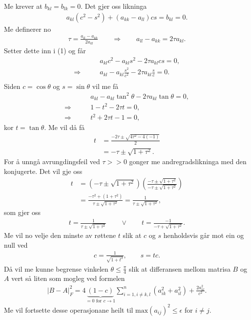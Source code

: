 \documentclass[11pt, a4paper]{article}
\begin{document}
    Me krever at $b_{kl} = b_{lk} = 0$. Det gjer oss likninga
    \begin{align}
      a_{kl}(c^2 - s^2) + (a_{kk} - a_{ll})cs = b_{kl} = 0.
    \end{align}
    Me definerer no 
    \begin{align*}
      \tau = \frac{a_{ll} - a_{kk}}{2a_{kl}} \qquad \Rightarrow \qquad a_{ll} - a_{kk} = 2\tau a_{kl}.
    \end{align*}
    Setter dette inn i (1) og får
    \begin{align*}
      &a_{kl}c^2 - a_{kl}s^2 - 2\tau a_{kl}cs = 0, \\
      \Rightarrow \qquad &a_{kl} - a_{kl}\frac{s^2}{c^2} - 2\tau a_{kl}\frac{s}{c} = 0. \\
    \end{align*}
    Siden $c = \cos{\theta}$ og $s = \sin{\theta}$ vil me få 
    \begin{align*}
      &a_{kl} - a_{kl}\tan^2{\theta} - 2\tau a_{kl} \tan{\theta} = 0, \\
      \Rightarrow \qquad &1 - t^2 - 2\tau t = 0, \\
      \Rightarrow \qquad &t^2 + 2\tau t - 1 = 0,
    \end{align*}
    kor $t = \tan{\theta}$. Me vil då få 
    \begin{align*}
      t &= \frac{-2\tau \pm \sqrt{4\tau^2 - 4(-1)}}{2} \\
      &= -\tau \pm \sqrt{1 + \tau^2}.
    \end{align*}
    For å unngå avrungdingsfeil ved $\tau >> 0$ gonger me andregradslikninga med den konjugerte. Det vil gje oss
    \begin{align*}
      t &= \left( -\tau \pm \sqrt{1 + \tau^2} \right)\left( \frac{-\tau \pm \sqrt{1 + \tau^2}}{-\tau \pm \sqrt{1 + \tau^2}} \right) \\
      &= \frac{-\tau^2 + (1 + \tau^2)}{\tau \pm \sqrt{1 + \tau^2}} = \frac{1}{\tau \pm \sqrt{1 + \tau^2}},
    \end{align*}
    som gjer oss
    \begin{align*}
      t = \frac{1}{\tau \pm \sqrt{1 + \tau^2}} \qquad \lor \qquad t = \frac{-1}{-\tau + \sqrt{1 + \tau^2}}.
    \end{align*}
    Me vil no velje den minste av røttene $t$ slik at $c$ og $s$ henholdsvis går mot ein og null ved
    \begin{align*}
      c = \frac{1}{\sqrt{1 + t^2}}, \qquad s = tc.
    \end{align*}
    Då vil me kunne begrense vinkelen $\theta \leq \frac{\pi}{4}$ slik at differansen mellom matrisa $B$ og $A$ vert så liten som mogleg ved formelen
    \begin{align*}
      \lvert B - A \rvert_F^2 = 4\underbrace{(1 - c)}_{= 0 \text{ for } c \to 1}\sum_{i = 1, i\ne k, l}^n(a_{ik}^2 + a_{il}^2) + \frac{2a_{kl}^2}{c^2}.
    \end{align*}
    Me vil fortsette desse operasjonane heilt til $\text{max}(a_{ij})^2 \leq \epsilon$ for $i \ne j$.
\end{document}
